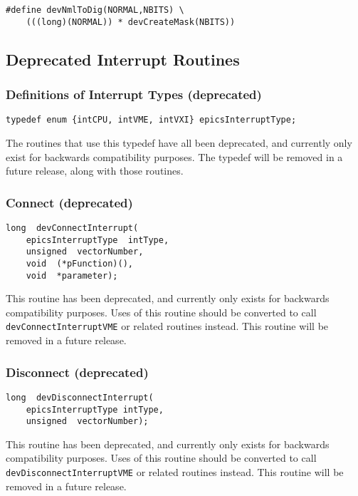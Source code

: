 \begin{verbatim}
#define devNmlToDig(NORMAL,NBITS) \
    (((long)(NORMAL)) * devCreateMask(NBITS))
\end{verbatim}

\subsection{Deprecated Interrupt Routines}

\subsubsection{Definitions of Interrupt Types (deprecated)}

\begin{verbatim}
typedef enum {intCPU, intVME, intVXI} epicsInterruptType;
\end{verbatim}

The routines that use this typedef have all been deprecated, and currently only exist for backwards compatibility purposes. 
The typedef will be removed in a future release, along with those routines.

\subsubsection{Connect (deprecated)}

\begin{verbatim}
long  devConnectInterrupt(
    epicsInterruptType  intType,
    unsigned  vectorNumber,
    void  (*pFunction)(),
    void  *parameter);
\end{verbatim}

This routine has been deprecated, and currently only exists for backwards compatibility purposes. Uses of this routine 
should be converted to call \verb|devConnectInterruptVME| or related routines instead. This routine will be removed in a 
future release.

\subsubsection{Disconnect (deprecated)}

\begin{verbatim}
long  devDisconnectInterrupt(
    epicsInterruptType intType,
    unsigned  vectorNumber);
\end{verbatim}

This routine has been deprecated, and currently only exists for backwards compatibility purposes. Uses of this routine 
should be converted to call \verb|devDisconnectInterruptVME| or related routines instead. This routine will be removed 
in a future release.


